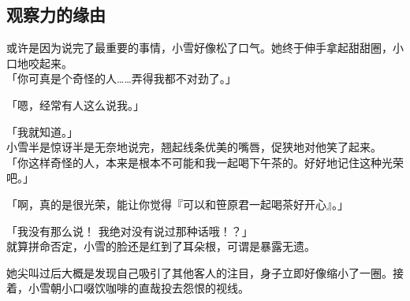 \subsection{观察力的缘由}

或许是因为说完了最重要的事情，小雪好像松了口气。她终于伸手拿起甜甜圈，小口地咬起来。\\

「你可真是个奇怪的人……弄得我都不对劲了。」

「嗯，经常有人这么说我。」

「我就知道。」\\

小雪半是惊讶半是无奈地说完，翘起线条优美的嘴唇，促狭地对他笑了起来。\\

「你这样奇怪的人，本来是根本不可能和我一起喝下午茶的。好好地记住这种光荣吧。」

「啊，真的是很光荣，能让你觉得『可以和笹原君一起喝茶好开心』。」

「我没有那么说！ 我绝对没有说过那种话哦！？」\\

就算拼命否定，小雪的脸还是红到了耳朵根，可谓是暴露无遗。

她尖叫过后大概是发现自己吸引了其他客人的注目，身子立即好像缩小了一圈。接着，小雪朝小口啜饮咖啡的直哉投去怨恨的视线。\\

